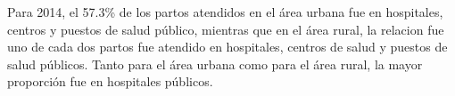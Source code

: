 Para 2014, el 57.3\% de los partos atendidos en el área urbana fue en hospitales, centros y puestos de salud público, mientras que en el área rural, la relacion fue uno de cada dos partos fue atendido en hospitales, centros de salud y puestos de salud públicos. Tanto para el área urbana como para el área rural, la mayor proporción fue en hospitales públicos.